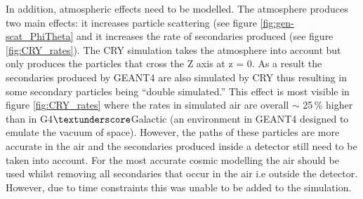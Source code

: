 In addition, atmospheric effects need to be modelled. The atmosphere produces two main effects: it increases particle scattering (see figure \ref{fig:gen-scat_PhiTheta} and it increases the rate of secondaries produced (see figure \ref{fig:CRY_rates}). The CRY simulation takes the atmosphere into account \cite{hagmann2007monteCry} but only produces the particles that cross the Z axis at z = 0. As a result the secondaries produced by GEANT4 are also simulated by CRY thus resulting in some secondary particles being ``double simulated.'' This effect is most visible in figure \ref{fig:CRY_rates} where the rates in simulated air are overall $\sim$ 25\,\% higher than in G4$\textunderscore$Galactic (an environment in GEANT4 designed to emulate the vacuum of space). However, the paths of these particles are more accurate in the air and the secondaries produced inside a detector still need to be taken into account. For the most accurate cosmic modelling the air should be used whilst removing all secondaries that occur in the air i.e outside the detector. However, due to time constraints this was unable to be added to the simulation. 

